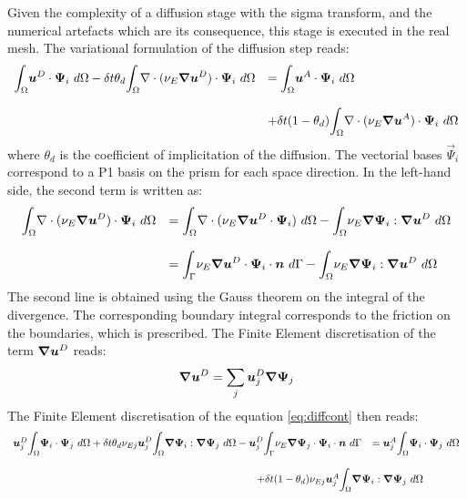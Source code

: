 Given the complexity of a diffusion stage with the sigma transform, and the
numerical artefacts which are its consequence, this stage is executed in the
real mesh.
The variational formulation of the diffusion step reads:
\begin{equation}
\begin{array}{ll}
\displaystyle{\int_\Omega}\vec{u}^D\cdot\vec{\Psi}_i~d\Omega -
\delta t \theta_d\displaystyle{\int_\Omega}\Div(\nu_{E}\Grad\vec{u}^D)\cdot\vec{\Psi}_i
~d\Omega & = \displaystyle{\int_\Omega}\vec{u}^A\cdot\vec{\Psi}_i~d\Omega \bigskip \\
& +\delta t (1-\theta_d)\displaystyle{\int_\Omega}
\Div(\nu_{E}\Grad\vec{u}^A)\cdot\vec{\Psi}_i~d\Omega
\end{array}\label{eq:diffcont}
\end{equation}
where $\theta_d$ is the coefficient of implicitation of the diffusion.
The vectorial bases $\vec{\Psi}_i$ correspond to a P1 basis on the prism
for each space direction.
In the left-hand side, the second term is written as:
\begin{equation}
\begin{array}{ll}
\displaystyle{\int_\Omega}\Div(\nu_{E}\Grad\vec{u}^D)\cdot\vec{\Psi}_i~d\Omega& =
\displaystyle{\int_\Omega}\Div(\nu_{E}\Grad\vec{u}^D\cdot\vec{\Psi}_i)~d\Omega
-\displaystyle{\int_\Omega}\nu_{E}\Grad\vec{\Psi}_i:\Grad\vec{u}^D~d\Omega \bigskip\\
& =\displaystyle{\int_\Gamma}\nu_{E}\Grad\vec{u}^D\cdot\vec{\Psi}_i\cdot\vec{n}
~d\Gamma - \displaystyle{\int_\Omega}\nu_{E}\Grad\vec{\Psi}_i:\Grad\vec{u}^D~d\Omega\end{array}
\end{equation}
The second line is obtained using the Gauss theorem on the integral of
the divergence. The corresponding boundary integral corresponds to the
friction on the boundaries, which is prescribed.
The Finite Element discretisation of the term $\bm{\nabla}\bm{u}^D$ reads:
\begin{equation}
\bm{\nabla}\bm{u}^D=\sum_j \bm{u}_j^D\bm{\nabla}\bm{\Psi}_j
\end{equation}
The Finite Element discretisation of the equation \eqref{eq:diffcont} then reads:
\begin{equation}
\begin{array}{ll}
\vec{u}_j^D\displaystyle{\int_\Omega}\vec{\Psi}_i\cdot\vec{\Psi}_j~d\Omega +
\delta t \theta_d\nu_{Ej}\vec{u}_j^D\displaystyle{\int_\Omega}\Grad\vec{\Psi}_i
:\Grad\vec{\Psi}_j~d\Omega - \vec{u}_j^D\displaystyle{\int_\Gamma}\nu_{E}\Grad\vec{\Psi}_j
\cdot\vec{\Psi}_i\cdot\vec{n}~d\Gamma& = \vec{u}_j^A\displaystyle{\int_\Omega}
\vec{\Psi}_i\cdot\vec{\Psi}_j~d\Omega \bigskip \\
& ~\hspace{-4cm}+\delta t (1-\theta_d)\nu_{Ej}\vec{u}_j^A\displaystyle{\int_\Omega}
\Grad\vec{\Psi}_i:\Grad\vec{\Psi}_j~d\Omega
\end{array}\label{eq:diff}
\end{equation}

